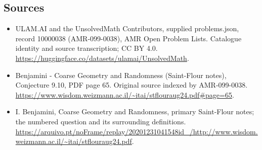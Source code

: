 \documentclass[11pt,a4paper]{article}
\begin{document}
\subsection{Sources}
\begin{itemize}
\item[S1] ULAM.AI and the UnsolvedMath Contributors, supplied problems.json, record 10000038 (AMR-099-0038), AMR Open Problem Lists. Catalogue identity and source transcription; CC BY 4.0.
\url{https://huggingface.co/datasets/ulamai/UnsolvedMath}.
\item[S2] Benjamini - Coarse Geometry and Randomness (Saint-Flour notes), Conjecture 9.10, PDF page 65. Original source indexed by AMR-099-0038.
\url{https://www.wisdom.weizmann.ac.il/~itai/stflouraug24.pdf#page=65}.
\item[S3] I. Benjamini, Coarse Geometry and Randomness, primary Saint-Flour notes; the numbered question and its surrounding definitions.
\url{https://arquivo.pt/noFrame/replay/20201231041548id_/http://www.wisdom.weizmann.ac.il/~itai/stflouraug24.pdf}.
\end{itemize}
\end{document}
